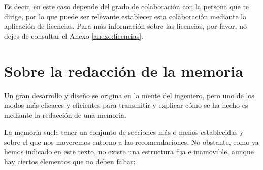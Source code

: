 Es decir, en este caso depende del grado de colaboración con la persona que te dirige, por lo que puede ser relevante establecer esta colaboración mediante la aplicación de licencias. Para más información sobre las licencias, por favor, no dejes de consultar el Anexo \ref{anexo:licencias}.




\section{Sobre la redacción de la memoria} %



Un gran desarrollo y diseño se origina en la mente del ingeniero, pero uno de los modos más eficaces y eficientes para transmitir y explicar cómo se ha hecho es mediante la redacción de una memoria. 

La memoria suele tener un conjunto de secciones más o menos establecidas y sobre el que nos moveremos entorno a las recomendaciones. No obstante, como ya hemos indicado en este texto, no existe una estructura fija e inamovible, aunque hay ciertos elementos que no deben faltar:


